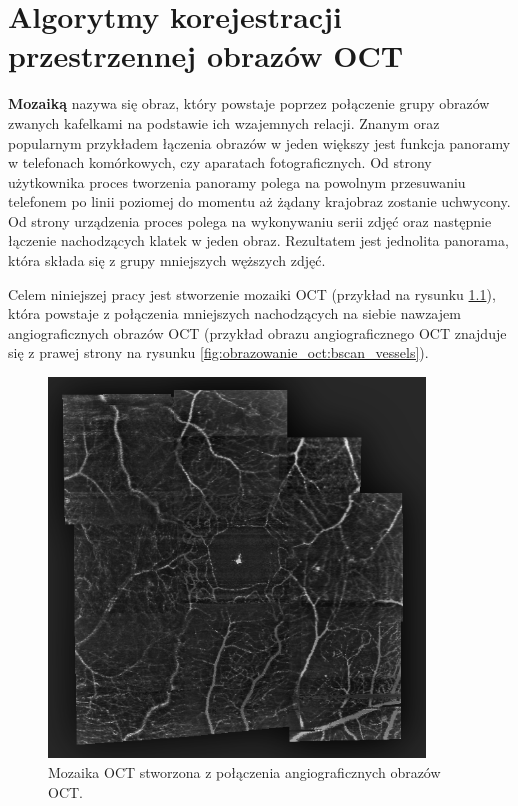 %
\chapter{Algorytmy korejestracji przestrzennej obrazów OCT}
\label{sec:algorytmy_korejestracji}

\textbf{Mozaiką} nazywa się obraz, który powstaje poprzez połączenie grupy obrazów zwanych kafelkami na podstawie ich wzajemnych relacji. Znanym oraz popularnym przykładem łączenia obrazów w jeden większy jest funkcja panoramy w telefonach komórkowych, czy aparatach fotograficznych. Od strony użytkownika proces tworzenia panoramy polega na powolnym przesuwaniu telefonem po linii poziomej do momentu aż żądany krajobraz zostanie uchwycony. Od strony urządzenia proces polega na wykonywaniu serii zdjęć oraz następnie łączenie nachodzących klatek w jeden obraz. Rezultatem jest jednolita panorama, która składa się z grupy mniejszych węższych zdjęć.

Celem niniejszej pracy jest stworzenie mozaiki OCT (przykład na rysunku \ref{fig:algorytmy_korejestracji:mosaic}), która powstaje z połączenia mniejszych nachodzących na siebie nawzajem angiograficznych obrazów OCT (przykład obrazu angiograficznego OCT znajduje się z prawej strony na rysunku \ref{fig:obrazowanie_oct:bscan_vessels}).

\begin{figure}[H]
  \centering
  \includegraphics[width=10cm]{gfx/mosaic}
  \caption{Mozaika OCT stworzona z połączenia angiograficznych obrazów OCT.}
  \label{fig:algorytmy_korejestracji:mosaic}
\end{figure}

